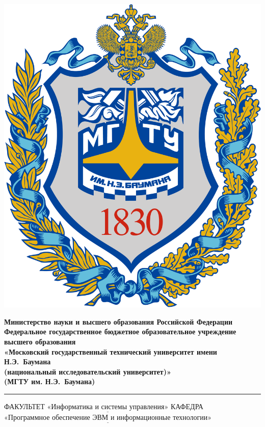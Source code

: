 \begin{titlepage}
	\fontsize{12pt}{12pt}\selectfont
	\noindent \begin{minipage}{0.15\textwidth}
		\includegraphics[width=\linewidth]{images/bmstu_logo.png}
	\end{minipage}
	\noindent\begin{minipage}{0.9\textwidth}\centering
		\textbf{Министерство науки и высшего образования Российской Федерации}\\
		\textbf{Федеральное государственное бюджетное образовательное учреждение высшего образования}\\
		\textbf{«Московский государственный технический университет имени Н.Э.~Баумана}\\
		\textbf{(национальный исследовательский университет)»}\\
		\textbf{(МГТУ им. Н.Э.~Баумана)}
	\end{minipage}
	
	\noindent\rule{18cm}{3pt}
	\newline\newline
	\noindent ФАКУЛЬТЕТ $\underline{\text{«Информатика и системы управления»}}$ \newline\newline
	\noindent КАФЕДРА $\underline{\text{«Программное обеспечение ЭВМ и информационные технологии»}}$\newline\newline\newline


\end{titlepage}
